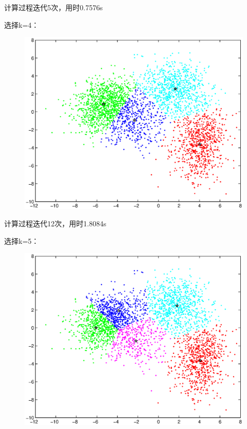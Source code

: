 \documentclass[UTF8]{ctexart}
\begin{document}
\par
计算过程迭代5次，用时0.7576s\par
选择k=4：\par
\begin{figure}[tbp]
  \centering
  \includegraphics[width=1.05\textwidth]{kmeans4.eps}
\end{figure}
\par
计算过程迭代12次，用时1.8084s\par
选择k=5：\par
\begin{figure}[tbp]
  \centering
  \includegraphics[width=1.05\textwidth]{kmeans5.eps}
\end{figure}
\end{document}
